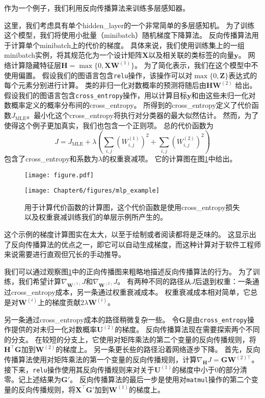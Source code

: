 作为一个例子，我们利用反向传播算法来训练多层感知器。

这里，我们考虑具有单个\gls{hidden_layer}的一个非常简单的多层感知机。
为了训练这个模型，我们将使用小批量（minibatch）随机梯度下降算法。
反向传播算法用于计算单个minibatch上的代价的梯度。
具体来说，我们使用训练集上的一组minibatch实例，将其规范化为一个设计矩阵$\bm{X}$以及相关联的类标签的向量$\bm{y}$。
网络计算隐藏特征层$\bm{H}=\max\{0, \bm{X}\bm{W}^{(1)}\}$。
为了简化表示，我们在这个模型中不使用偏置。
假设我们的图语言包含\verb|relu|操作，该操作可以对$\max\{0,\bm{Z}\}$表达式的每个元素分别进行计算。
类的非归一化对数概率的预测将随后由$\bm{H}\bm{W}^{(2)}$ 给出。
假设我们的图语言包含\verb|cross_entropy|操作，用以计算目标$\bm{y}$和由这些未归一化对数概率定义的概率分布间的\gls{cross_entropy}。
所得到的\gls{cross_entropy}定义了代价函数$J_\text{MLE}$。最小化这个\gls{cross_entropy}将执行对分类器的最大似然估计。
然而，为了使得这个例子更加真实，我们也包含一个正则项。
总的代价函数为
\begin{equation}
  J = J_{\text{MLE}} + \lambda \left ( \sum_{i, j} \left (W_{i, j}^{(1)} \right )^2 + \sum_{i, j} \left (W_{i, j}^{(2)} \right)^2 \right )
\end{equation}
包含了\gls{cross_entropy}和系数为$\lambda$的权重衰减项。
它的计算图在图\ref{fig:chap6_mlp_example}中给出。
\begin{figure}[!htb]
\ifOpenSource
\centerline{\texttt{[image: figure.pdf]}}
\else
\centerline{\texttt{[image: Chapter6/figures/mlp\_example]}}
\fi
\caption{用于计算代价函数的计算图，这个代价函数是使用\gls{cross_entropy}损失以及权重衰减训练我们的单层示例所产生的。}
\label{fig:chap6_mlp_example}
\end{figure}

这个示例的梯度计算图实在太大，以至于绘制或者阅读都将是乏味的。
这显示出了反向传播算法的优点之一，即它可以自动生成梯度，而这种计算对于软件工程师来说需要进行直观但冗长的手动推导。

我们可以通过观察图\ref{fig:chap6_mlp_example}中的正向传播图来粗略地描述反向传播算法的行为。
为了训练，我们希望计算$\nabla_{\bm{W}^{(1)}} J$和$\nabla_{\bm{W}^{(2)}} J$。
有两种不同的路径从$J$后退到权重：一条通过\gls{cross_entropy}成本，另一条通过权重衰减成本。
权重衰减成本相对简单，它总是对$\bm{W}^{(i)}$上的梯度贡献$2\lambda \bm{W}^{(i)}$。
  
  
另一条通过\gls{cross_entropy}成本的路径稍微复杂一些。
令$\bm{G}$是由\verb|cross_entropy|操作提供的对未归一化对数概率$\bm{U}^{(2)}$的梯度。
反向传播算法现在需要探索两个不同的分支。
在较短的分支上，它使用对矩阵乘法的第二个变量的反向传播规则，将$\bm{H}^\top \bm{G}$加到$\bm{W}^{(2)}$的梯度上。
另一条更长些的路径沿着网络逐步下降。
首先，反向传播算法使用对矩阵乘法的第一个变量的反向传播规则，计算$\nabla_{\bm{H}} J = \bm{G}\bm{W}^{(2)\top}$。
接下来，\verb|relu|操作使用其反向传播规则来对关于$\bm{U}^{(1)}$的梯度中小于0的部分清零。记上述结果为$\bm{G}'$。 
反向传播算法的最后一步是使用对\verb|matmul|操作的第二个变量的反向传播规则，将$\bm{X}^\top \bm{G}'$加到$\bm{W}^{(1)}$的梯度上。

